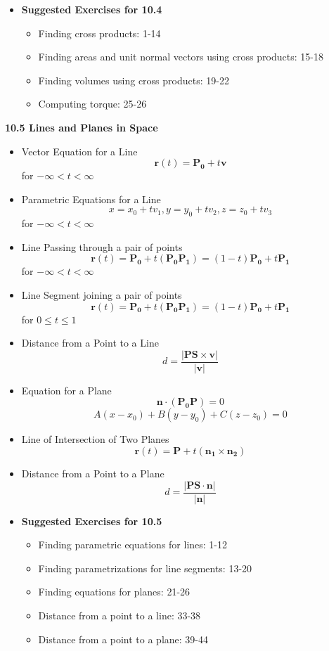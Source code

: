 \documentclass[12pt]{article}
\newcommand{\vect}[1]{\mathbf{#1}}
\newcommand{\<}{\left<}
\renewcommand{\>}{\right>}
\begin{document}
\begin{itemize}
		\item \textbf{Suggested Exercises for 10.4}
			\begin{itemize}
			\item Finding cross products: 1-14
			\item Finding areas and unit normal vectors using cross products: 15-18
			\item Finding volumes using cross products: 19-22
			\item Computing torque: 25-26
			\end{itemize}
		\end{itemize}

\newpage

\centerline{\bf 10.5 Lines and Planes in Space}
	
		\begin{itemize}
		\item Vector Equation for a Line
			\[\vect{r}(t) = \vect{P_0} + t\vect{v}\] for $-\infty < t < \infty$
		
		\item Parametric Equations for a Line
			\[x = x_0 + tv_1, y = y_0 + tv_2, z = z_0 + tv_3\] for $-\infty < t < \infty$
		
		\item Line Passing through a pair of points
			\[\vect{r}(t) = \vect{P_0} + t(\vect{P_0P_1})=(1-t)\vect{P_0}+t\vect{P_1}\] for $-\infty < t < \infty$
		
		\item Line Segment joining a pair of points
			\[\vect{r}(t) = \vect{P_0} + t(\vect{P_0P_1})=(1-t)\vect{P_0}+t\vect{P_1}\] for $0 \leq t \leq 1$
		
		\item Distance from a Point to a Line
			\[d = \frac{|\vect{PS} \times \vect{v}|}{|\vect{v}|}\]
		
		\item Equation for a Plane
			\[\vect{n} \cdot (\vect{P_0}\vect{P}) = 0\] 
			\[A(x-x_0) + B(y-y_0) + C(z-z_0) = 0\] 
		
		\item Line of Intersection of Two Planes
			\[\vect{r}(t) = \vect{P} + t(\vect{n_1} \times \vect{n_2})\]
		
		\item Distance from a Point to a Plane
			\[d = \frac{|\vect{PS} \cdot \vect{n}|}{|\vect{n}|}\]
\newpage
		\item \textbf{Suggested Exercises for 10.5}
			\begin{itemize}
			\item Finding parametric equations for lines: 1-12
			\item Finding parametrizations for line segments: 13-20
			\item Finding equations for planes: 21-26
			\item Distance from a point to a line: 33-38
			\item Distance from a point to a plane: 39-44
			\end{itemize}
		
		\end{itemize}
\end{document}
